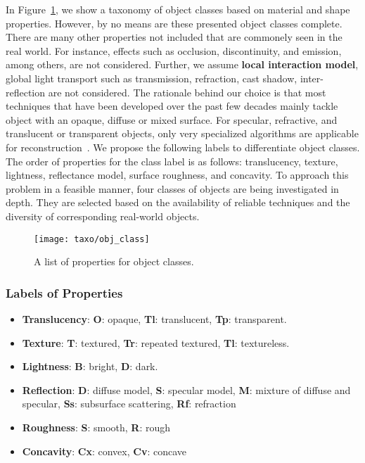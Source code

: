 In Figure~\ref{fig:obj_class}, we show a taxonomy of object classes based on material and shape properties. However, by no means are these presented object classes complete. There are many other properties not included that are commonely seen in the real world. For instance, effects such as occlusion, discontinuity, and emission, among others, are not considered. Further, we assume \textbf{local interaction model}, \ie global light transport such as transmission, refraction, cast shadow, inter-reflection are not considered. The rationale behind our choice is that most techniques that have been developed over the past few decades mainly tackle object with an opaque, diffuse or mixed surface. For specular, refractive, and translucent or transparent objects, only very specialized algorithms are applicable for reconstruction~\cite{ihrke2010transparent}. We propose the following labels to differentiate object classes. The order of properties for the class label is as follows: translucency, texture, lightness, reflectance model, surface roughness, and concavity. To approach this problem in a feasible manner, four classes of objects are being investigated in depth. They are selected based on the availability of reliable techniques and the diversity of corresponding real-world objects.
\begin{figure}[!htbp]
\centering
\texttt{[image: taxo/obj\_class]}\\
\caption{A list of properties for object classes.}
\label{fig:obj_class}
\end{figure}

\subsubsection{Labels of Properties}
\begin{itemize}
\item \textbf{Translucency}: \textbf{O}: opaque, \textbf{Tl}: translucent, \textbf{Tp}: transparent.
\item \textbf{Texture}: \textbf{T}: textured, \textbf{Tr}: repeated textured, \textbf{Tl}: textureless.
\item \textbf{Lightness}: \textbf{B}: bright, \textbf{D}: dark.
\item \textbf{Reflection}: \textbf{D}: diffuse model, \textbf{S}: specular model, \textbf{M}: mixture of diffuse and specular, \textbf{Ss}: subsurface scattering, \textbf{Rf}: refraction
\item \textbf{Roughness}: \textbf{S}: smooth, \textbf{R}: rough
\item \textbf{Concavity}: \textbf{Cx}: convex, \textbf{Cv}: concave
\end{itemize}

